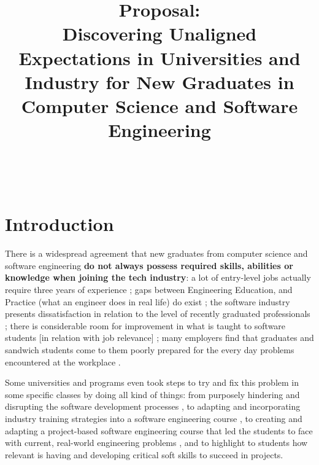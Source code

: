 \documentclass{sigchi}
\begin{document}
\title{Proposal:\\ Discovering Unaligned Expectations in Universities and Industry for New Graduates in Computer Science and Software Engineering}

\author{%
  \\
  \\
}

\maketitle

\section{Introduction}
There is a widespread agreement that new graduates from computer science and software engineering \textbf{do not always possess required skills, abilities or knowledge when joining the tech industry}: a lot of entry-level jobs actually require three years of experience \cite{Chakrabarti2018}; gaps between Engineering Education, and Practice (what an engineer does in real life) do exist \cite{Sivanesan2017}; the software industry presents dissatisfaction in relation to the level of recently graduated professionals \cite{Portela2017}; there is considerable room for improvement in what is taught to software students [in relation with job relevance] \cite{Lethbridgea}; many employers find that graduates and sandwich students come to them poorly prepared for the every day problems encountered at the workplace \cite{Dawson2000}.

Some universities and programs even took steps to try and fix this problem in some specific classes by doing all kind of things: from purposely hindering and disrupting the software development processes \cite{Dawson2000}, to adapting and incorporating industry training strategies into a software engineering course \cite{Portela2017}, to creating and adapting a project-based software engineering course that led the students to face with current, real-world engineering problems \cite{Delgado2017}, and to highlight to students how relevant is having and developing critical soft skills to succeed in projects\cite{Bastarrica2017}.
\end{document}
